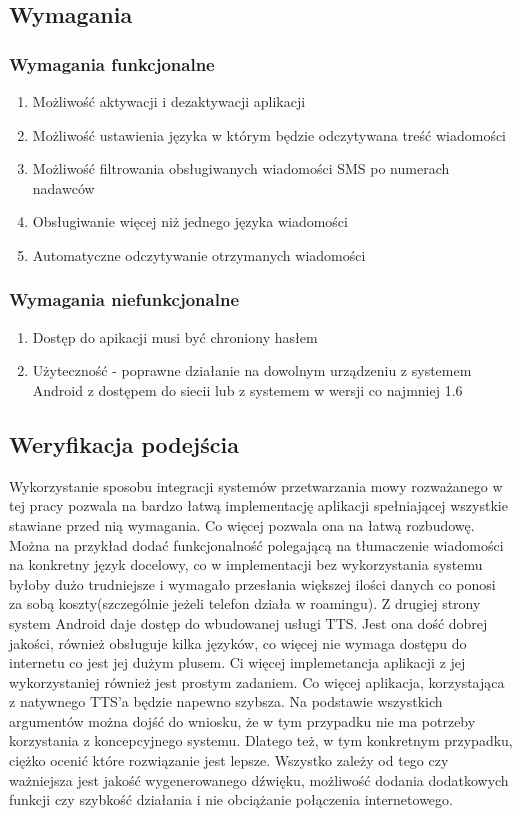\subsection{Wymagania}
\subsubsection{Wymagania funkcjonalne}
\begin{enumerate}
	\item Możliwość aktywacji i dezaktywacji aplikacji
	\item Możliwość ustawienia języka w którym będzie odczytywana treść wiadomości
	\item Możliwość filtrowania obsługiwanych wiadomości SMS po numerach nadawców 
	\item Obsługiwanie więcej niż jednego języka wiadomości
	\item Automatyczne odczytywanie otrzymanych wiadomości
\end{enumerate}
\subsubsection{Wymagania niefunkcjonalne}
\begin{enumerate}
	\item Dostęp do apikacji musi być chroniony hasłem
	\item Użyteczność - poprawne działanie na dowolnym urządzeniu z systemem Android z dostępem do siecii lub z systemem w wersji co najmniej 1.6
\end{enumerate}

\subsection{Weryfikacja podejścia}
Wykorzystanie sposobu integracji systemów przetwarzania mowy rozważanego w tej pracy pozwala na bardzo łatwą implementację aplikacji spełniającej wszystkie stawiane przed nią wymagania. Co więcej pozwala ona na łatwą rozbudowę. Można na przykład dodać funkcjonalność polegającą na tłumaczenie wiadomości na konkretny język docelowy, co w implementacji bez wykorzystania systemu byłoby dużo trudniejsze i wymagało przesłania większej ilości danych co ponosi za sobą koszty(szczególnie jeżeli telefon działa w roamingu). Z drugiej strony system Android daje dostęp do wbudowanej usługi TTS. Jest ona dość dobrej jakości, również obsługuje kilka języków, co więcej nie wymaga dostępu do internetu co jest jej dużym plusem. Ci więcej implemetancja aplikacji z jej wykorzystaniej również jest prostym zadaniem. Co więcej aplikacja, korzystająca z natywnego TTS'a będzie napewno szybsza. Na podstawie wszystkich argumentów można dojść do wniosku, że w tym przypadku nie ma potrzeby korzystania z koncepcyjnego systemu. Dlatego też, w tym konkretnym przypadku, ciężko ocenić które rozwiązanie jest lepsze. Wszystko zależy od tego czy ważniejsza jest jakość wygenerowanego dźwięku, możliwość dodania dodatkowych funkcji czy szybkość działania i nie obciążanie połączenia internetowego.

